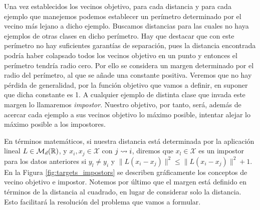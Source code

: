 Una vez establecidos los vecinos objetivo, para cada distancia y para cada ejemplo que manejemos podemos establecer un perímetro determinado por el vecino más lejano a dicho ejemplo. Buscamos distancias para las cuales no haya ejemplos de otras clases en dicho perímetro. Hay que destacar que con este perímetro no hay suficientes garantías de separación, pues la distancia encontrada podría haber colapsado todos los vecinos objetivo en un punto y entonces el perímetro tendría radio cero. Por ello se considera un margen determinado por el radio del perímetro, al que se añade una constante positiva. Veremos que no hay pérdida de generalidad, por la función objetivo que vamos a definir, en suponer que dicha constante es 1. A cualquier ejemplo de distinta clase que invada este margen lo llamaremos \emph{impostor}. Nuestro objetivo, por tanto, será, además de acercar cada ejemplo a sus vecinos objetivo lo máximo posible, intentar alejar lo máximo posible a los impostores.

En términos matemáticos, si nuestra distancia está determinada por la aplicación lineal $L \in \mathcal{M}_{d}(\mathbb{R})$, y $x_i, x_j \in \mathcal{X}$ con $j \rightsquigarrow i$, diremos que $x_l \in \mathcal{X}$ es un impostor para los datos anteriores si $y_l \ne y_i$ y $\|L(x_i - x_j)\|^2 \le \|L(x_i - x_j)\|^2+1$. En la Figura \ref{fig:targets_impostors} se describen gráficamente los conceptos de vecino objetivo e impostor. Notemos por último que el margen está definido en términos de la distancia al cuadrado, en lugar de considerar solo la distancia. Esto facilitará la resolución del problema que vamos a formular.

